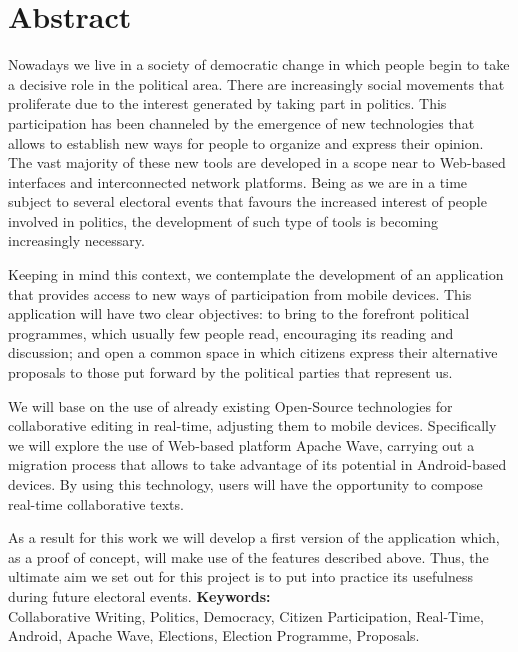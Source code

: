 \newpage
\renewcommand{\thepage}{\Roman{page}}
\setcounter{page}{9}
\chapter*{Abstract}
Nowadays we live in a society of democratic change in which people begin to take a decisive role  in the political area. There are increasingly social movements that proliferate due to the interest generated by taking part in politics. This participation has been channeled by the emergence of new technologies that allows to establish new ways for people to organize and express their opinion. The vast majority of these new tools are developed in a scope near to Web-based interfaces and interconnected network platforms. Being as we are in a time subject to several electoral events that favours the increased interest of people involved in politics, the development of such type of tools is becoming increasingly necessary.

Keeping in mind this context, we contemplate the development of an application that provides access to new ways of participation from mobile devices. This application will have two clear objectives: to bring to the forefront political programmes, which usually few people read, encouraging its reading and discussion; and open a common space in which citizens express their alternative proposals to those put forward by the political parties that represent us.
 
We will base on the use of already existing Open-Source technologies for collaborative editing in real-time, adjusting them to mobile devices. Specifically we will explore the use of Web-based platform Apache Wave, carrying out a migration process that allows to take advantage of its potential in Android-based devices. By using this technology, users will have the opportunity to compose real-time collaborative texts.

As a result for this work we will develop a first version of the application which, as a proof of concept, will make use of the features described above. Thus, the ultimate aim we set out for this project is to put into practice its usefulness during future electoral events.
\vfill
{\large \bf Keywords:}\\
{\large Collaborative Writing, Politics, Democracy, Citizen Participation, Real-Time, Android, Apache Wave, Elections, Election Programme, Proposals. }

\newpage
\renewcommand{\thepage}{\Roman{page}}
\setcounter{page}{10}
